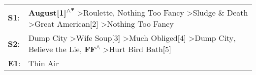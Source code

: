 \begin{supertabular}{p{0.03\textwidth}p{0.92\textwidth}}
 \textbf{S1}:  &                          \textbf{August[1]\textsuperscript{$\wedge$*}} \textgreater \enspace Roulette\textsuperscript{}, \enspace Nothing Too Fancy\textsuperscript{} \textgreater \enspace Sludge \& Death\textsuperscript{} \textgreater \enspace Great American[2]\textsuperscript{} \textgreater \enspace Nothing Too Fancy\textsuperscript{}  \enspace  \\
 \textbf{S2}:  &  Dump City\textsuperscript{} \textgreater \enspace Wife Soup[3]\textsuperscript{} \textgreater \enspace Much Obliged[4]\textsuperscript{} \textgreater \enspace Dump City\textsuperscript{}, \enspace Believe the Lie\textsuperscript{}, \enspace \textbf{FF\textsuperscript{$\wedge$}} \textgreater \enspace Hurt Bird Bath[5]\textsuperscript{}  \enspace  \\
 \textbf{E1}:  &                                                                                                                                                                                                                                                                                                                        Thin Air\textsuperscript{}  \enspace  \\
\end{supertabular}
